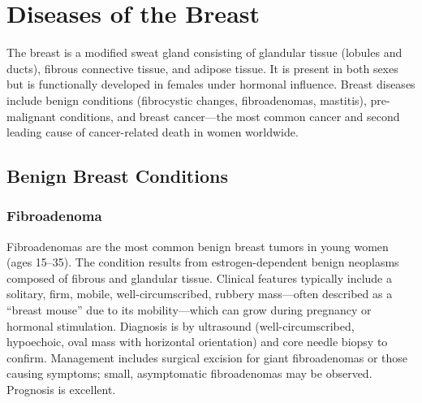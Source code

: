 \chapter{Diseases of the Breast}
\label{ch:breast}
The breast is a modified sweat gland consisting of glandular tissue (lobules and ducts), fibrous connective tissue, and adipose tissue. It is present in both sexes but is functionally developed in females under hormonal influence. Breast diseases include benign conditions (fibrocystic changes, fibroadenomas, mastitis), pre-malignant conditions, and breast cancer---the most common cancer and second leading cause of cancer-related death in women worldwide.

\section{Benign Breast Conditions}








\label{sec:Benign Breast Conditions}

\subsection{Fibroadenoma}
\label{sec:Fibroadenoma}
Fibroadenomas are the most common benign breast tumors in young women (ages 15--35). The condition results from estrogen-dependent benign neoplasms composed of fibrous and glandular tissue. Clinical features typically include a solitary, firm, mobile, well-circumscribed, rubbery mass---often described as a ``breast mouse'' due to its mobility---which can grow during pregnancy or hormonal stimulation. Diagnosis is by ultrasound (well-circumscribed, hypoechoic, oval mass with horizontal orientation) and core needle biopsy to confirm. Management includes surgical excision for giant fibroadenomas or those causing symptoms; small, asymptomatic fibroadenomas may be observed. Prognosis is excellent.

